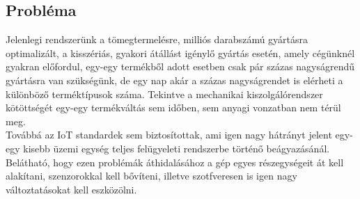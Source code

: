 \documentclass{article}
\begin{document}
\subsection{Probléma}
Jelenlegi rendszerünk a tömegtermelésre, milliós darabszámú gyártásra optimalizált,
a kisszériás, gyakori átállást igénylő gyártás esetén, amely cégünknél gyakran előfordul,
egy-egy termékből adott esetben csak pár százas nagyságrendű gyártásra van szükségünk, de egy nap
akár a százas nagyságrendet is elérheti a különböző terméktípusok száma. Tekintve a mechanikai
kiszolgálórendszer kötöttségét egy-egy termékváltás sem időben, sem anyagi vonzatban nem 
térül meg.\\
Továbbá az IoT standardek sem biztosítottak, ami igen nagy hátrányt jelent egy-egy kisebb
üzemi egység teljes felügyeleti rendszerbe történő beágyazásánál.\\
Belátható, hogy ezen problémák áthidalásához a gép egyes részegységeit át kell alakítani,
szenzorokkal kell bővíteni, illetve szotfveresen is igen nagy változtatásokat kell eszközölni.


\newpage
\end{document}
